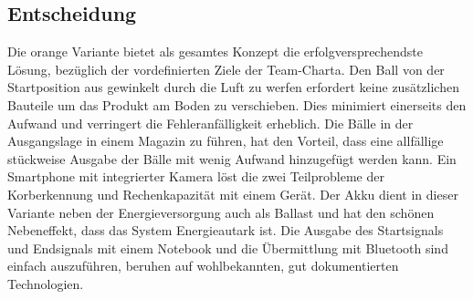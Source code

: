 \subsection{Entscheidung}
Die orange Variante bietet als gesamtes Konzept die erfolgversprechendste Lösung, bezüglich der vordefinierten Ziele der Team-Charta. Den Ball von der Startposition aus gewinkelt durch die Luft zu werfen erfordert keine zusätzlichen Bauteile um das Produkt am Boden zu verschieben. Dies minimiert einerseits den Aufwand und verringert die Fehleranfälligkeit erheblich. Die Bälle in der Ausgangslage in einem Magazin zu führen, hat den Vorteil, dass eine allfällige stückweise Ausgabe der Bälle mit wenig Aufwand hinzugefügt werden kann. Ein Smartphone mit integrierter Kamera löst die zwei Teilprobleme der Korberkennung und Rechenkapazität mit einem Gerät. Der Akku dient in dieser Variante neben der Energieversorgung auch als Ballast und hat den schönen Nebeneffekt, dass das System Energieautark ist. Die Ausgabe des Startsignals und Endsignals mit einem Notebook und die Übermittlung mit Bluetooth sind einfach auszuführen, beruhen auf wohlbekannten, gut dokumentierten Technologien.